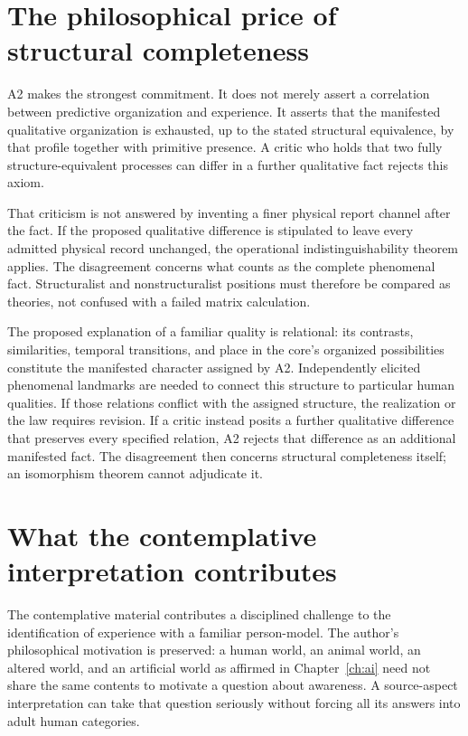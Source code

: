 \section{The philosophical price of structural completeness}\label{section:resolution:the-philosophical-price-of-structural-completeness}
A2 makes the strongest commitment. It does not merely assert a correlation between predictive organization and experience. It asserts that the manifested qualitative organization is exhausted, up to the stated structural equivalence, by that profile together with primitive presence. A critic who holds that two fully structure-equivalent processes can differ in a further qualitative fact rejects this axiom.

That criticism is not answered by inventing a finer physical report channel after the fact. If the proposed qualitative difference is stipulated to leave every admitted physical record unchanged, the operational indistinguishability theorem applies. The disagreement concerns what counts as the complete phenomenal fact. Structuralist and nonstructuralist positions must therefore be compared as theories, not confused with a failed matrix calculation.

The proposed explanation of a familiar quality is relational: its contrasts, similarities, temporal transitions, and place in the core's organized possibilities constitute the manifested character assigned by A2. Independently elicited phenomenal landmarks are needed to connect this structure to particular human qualities. If those relations conflict with the assigned structure, the realization or the law requires revision. If a critic instead posits a further qualitative difference that preserves every specified relation, A2 rejects that difference as an additional manifested fact. The disagreement then concerns structural completeness itself; an isomorphism theorem cannot adjudicate it.

\section{What the contemplative interpretation contributes}\label{section:resolution:what-the-contemplative-interpretation-contributes}
The contemplative material contributes a disciplined challenge to the identification of experience with a familiar person-model. The author's philosophical motivation is preserved: a human world, an animal world, an altered world, and an artificial world as affirmed in Chapter~\ref{ch:ai} need not share the same contents to motivate a question about awareness. A source-aspect interpretation can take that question seriously without forcing all its answers into adult human categories.

